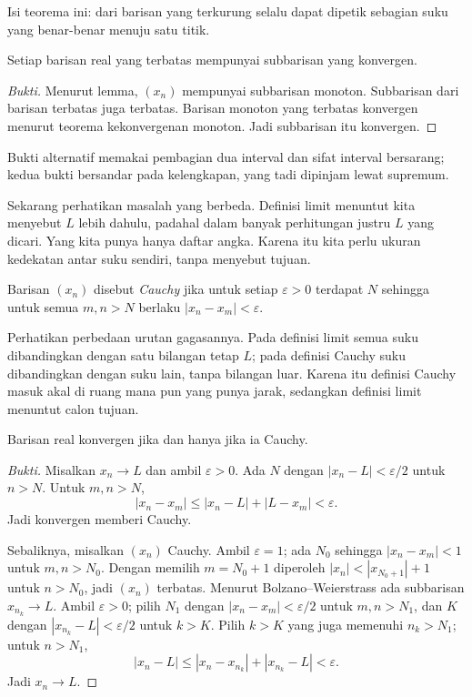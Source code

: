Isi teorema ini: dari barisan yang terkurung selalu dapat dipetik sebagian suku yang
benar-benar menuju satu titik.

\begin{teorema}
Setiap barisan real yang terbatas mempunyai subbarisan yang konvergen.
\end{teorema}

\begin{proof}[Bukti]
Menurut lemma, $(x_n)$ mempunyai subbarisan monoton. Subbarisan dari barisan
terbatas juga terbatas. Barisan monoton yang terbatas konvergen menurut teorema
kekonvergenan monoton. Jadi subbarisan itu konvergen.
\end{proof}

Bukti alternatif memakai pembagian dua interval dan sifat interval bersarang; kedua
bukti bersandar pada kelengkapan, yang tadi dipinjam lewat supremum.


Sekarang perhatikan masalah yang berbeda. Definisi limit menuntut kita menyebut
$L$ lebih dahulu, padahal dalam banyak perhitungan justru $L$ yang dicari. Yang
kita punya hanya daftar angka. Karena itu kita perlu ukuran kedekatan antar suku
sendiri, tanpa menyebut tujuan.

\begin{definisi}
Barisan $(x_n)$ disebut \emph{Cauchy} jika untuk setiap
$\varepsilon>0$ terdapat $N$ sehingga untuk semua $m,n>N$ berlaku
$|x_n-x_m|<\varepsilon$.
\end{definisi}

Perhatikan perbedaan urutan gagasannya. Pada definisi limit semua suku dibandingkan
dengan satu bilangan tetap $L$; pada definisi Cauchy suku dibandingkan dengan suku
lain, tanpa bilangan luar. Karena itu definisi Cauchy masuk akal di ruang mana pun
yang punya jarak, sedangkan definisi limit menuntut calon tujuan.

\begin{teorema}
Barisan real konvergen jika dan hanya jika ia Cauchy.
\end{teorema}

\begin{proof}[Bukti]
Misalkan $x_n \to L$ dan ambil $\varepsilon>0$. Ada $N$ dengan
$|x_n-L|<\varepsilon/2$ untuk $n>N$. Untuk $m,n>N$,
\[
|x_n-x_m| \le |x_n-L| + |L-x_m| < \varepsilon .
\]
Jadi konvergen memberi Cauchy.

Sebaliknya, misalkan $(x_n)$ Cauchy. Ambil $\varepsilon=1$; ada $N_0$ sehingga
$|x_n-x_m|<1$ untuk $m,n>N_0$. Dengan memilih $m=N_0+1$ diperoleh
$|x_n|<|x_{N_0+1}|+1$ untuk $n>N_0$, jadi $(x_n)$ terbatas. Menurut
Bolzano--Weierstrass ada subbarisan $x_{n_k} \to L$. Ambil $\varepsilon>0$; pilih
$N_1$ dengan $|x_n-x_m|<\varepsilon/2$ untuk $m,n>N_1$, dan $K$ dengan
$|x_{n_k}-L|<\varepsilon/2$ untuk $k>K$. Pilih $k>K$ yang juga memenuhi
$n_k>N_1$; untuk $n>N_1$,
\[
|x_n-L| \le |x_n-x_{n_k}| + |x_{n_k}-L| < \varepsilon .
\]
Jadi $x_n \to L$.
\end{proof}

